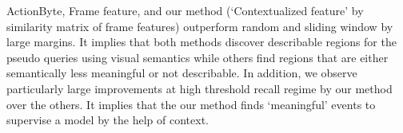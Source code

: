 ActionByte, Frame feature, and our method (`Contextualized feature' by similarity matrix of frame features) outperform random and sliding window by large margins.
It implies that both methods discover describable regions for the pseudo queries using visual semantics while others find regions that are either semantically less meaningful or not describable.
%
In addition, we observe particularly large improvements at high threshold recall regime by our method over the others.
It implies that the our method finds `meaningful' events to supervise a model by the help of context.


